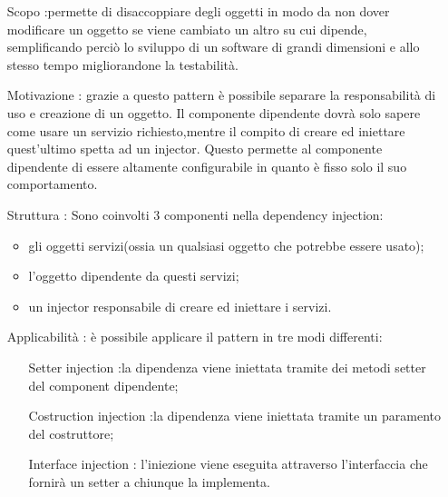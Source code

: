 
\begin{itemize}
\item [Scopo]:permette di disaccoppiare degli oggetti in modo da non dover modificare un oggetto se viene cambiato un altro su cui dipende, semplificando perciò lo sviluppo di un software di grandi dimensioni e allo stesso tempo migliorandone la testabilità.
\item [Motivazione]: grazie a questo pattern è possibile separare la responsabilità di uso e creazione di un oggetto. Il componente dipendente dovrà solo sapere come usare un servizio richiesto,mentre il compito di creare ed iniettare quest'ultimo spetta ad un injector. Questo permette al componente dipendente di essere altamente configurabile in quanto è fisso solo il suo comportamento.
\item[Struttura]: Sono coinvolti 3 componenti nella dependency injection:
	\begin{itemize}
		\item gli oggetti servizi(ossia un qualsiasi oggetto che potrebbe essere usato);
		\item l'oggetto dipendente da questi servizi;
		\item un injector responsabile di creare ed iniettare i servizi.
	\end{itemize}
\item [Applicabilità]: è possibile applicare il pattern in tre modi differenti:
	\begin{itemize}
	\item [Setter injection]:la dipendenza viene iniettata tramite dei metodi setter del component dipendente;
	\item [Costruction injection]:la dipendenza viene iniettata tramite un paramento del costruttore;
	\item [Interface injection]: l'iniezione viene eseguita attraverso l'interfaccia che fornirà un setter a chiunque la implementa.
	\end{itemize}
\end{itemize}